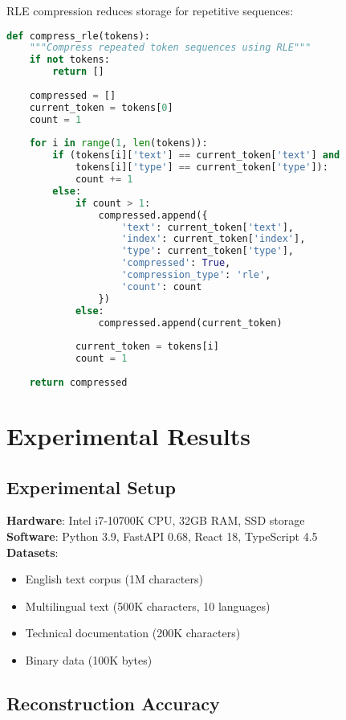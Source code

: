 \documentclass[conference]{IEEEtran}
\begin{document}
RLE compression reduces storage for repetitive sequences:

\begin{lstlisting}[language=Python, caption=RLE Compression Algorithm]
def compress_rle(tokens):
    """Compress repeated token sequences using RLE"""
    if not tokens:
        return []
    
    compressed = []
    current_token = tokens[0]
    count = 1
    
    for i in range(1, len(tokens)):
        if (tokens[i]['text'] == current_token['text'] and 
            tokens[i]['type'] == current_token['type']):
            count += 1
        else:
            if count > 1:
                compressed.append({
                    'text': current_token['text'],
                    'index': current_token['index'],
                    'type': current_token['type'],
                    'compressed': True,
                    'compression_type': 'rle',
                    'count': count
                })
            else:
                compressed.append(current_token)
            
            current_token = tokens[i]
            count = 1
    
    return compressed
\end{lstlisting}

\section{Experimental Results}

\subsection{Experimental Setup}

\textbf{Hardware}: Intel i7-10700K CPU, 32GB RAM, SSD storage\\
\textbf{Software}: Python 3.9, FastAPI 0.68, React 18, TypeScript 4.5\\
\textbf{Datasets}: 
\begin{itemize}
    \item English text corpus (1M characters)
    \item Multilingual text (500K characters, 10 languages)
    \item Technical documentation (200K characters)
    \item Binary data (100K bytes)
\end{itemize}

\subsection{Reconstruction Accuracy}
\end{document}

